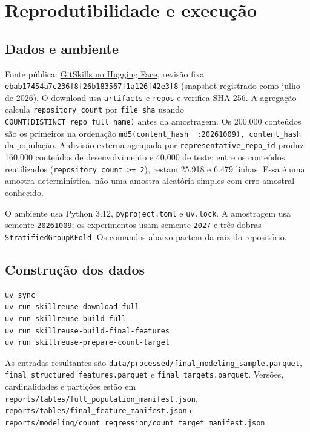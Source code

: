 \section{Reprodutibilidade e
execução}\label{reprodutibilidade-e-execuuxe7uxe3o}

\subsection{Dados e ambiente}\label{dados-e-ambiente}

Fonte pública:
\href{https://huggingface.co/datasets/mvaccargiu/gitskills}{GitSkills no
Hugging Face}, revisão fixa
\texttt{ebab17454a7c236f8f26b183567f1a126f42e3f8} (snapshot registrado
como julho de 2026). O download usa \texttt{artifacts} e \texttt{repos}
e verifica SHA-256. A agregação calcula \texttt{repository\_count} por
\texttt{file\_sha} usando \texttt{COUNT(DISTINCT\ repo\_full\_name)}
antes da amostragem. Os 200.000 conteúdos são os primeiros na ordenação
\texttt{md5(content\_hash\ \textbar{}\textbar{}\ \textquotesingle{}:20261009\textquotesingle{}),\ content\_hash}
da população. A divisão externa agrupada por
\texttt{representative\_repo\_id} produz 160.000 conteúdos de
desenvolvimento e 40.000 de teste; entre os conteúdos reutilizados
(\texttt{repository\_count\ \textgreater{}=\ 2}), restam 25.918 e 6.479
linhas. Essa é uma amostra determinística, não uma amostra aleatória
simples com erro amostral conhecido.

O ambiente usa Python 3.12, \texttt{pyproject.toml} e \texttt{uv.lock}.
A amostragem usa semente \texttt{20261009}; os experimentos usam semente
\texttt{2027} e três dobras \texttt{StratifiedGroupKFold}. Os comandos
abaixo partem da raiz do repositório.

\subsection{Construção dos dados}\label{construuxe7uxe3o-dos-dados}

\begin{verbatim}
uv sync
uv run skillreuse-download-full
uv run skillreuse-build-full
uv run skillreuse-build-final-features
uv run skillreuse-prepare-count-target
\end{verbatim}

As entradas resultantes são
\texttt{data/processed/final\_modeling\_sample.parquet},
\texttt{final\_structured\_features.parquet} e
\texttt{final\_targets.parquet}. Versões, cardinalidades e partições
estão em \texttt{reports/tables/full\_population\_manifest.json},
\texttt{reports/tables/final\_feature\_manifest.json} e
\texttt{reports/modeling/count\_regression/count\_target\_manifest.json}.

